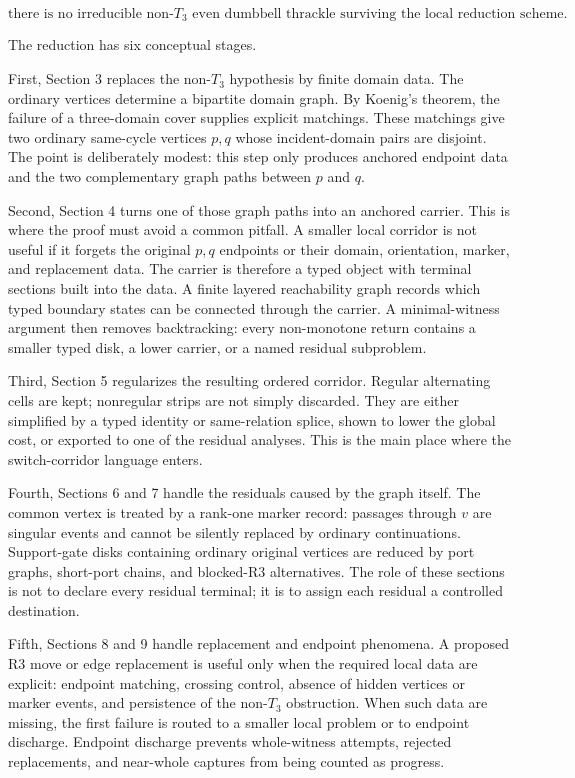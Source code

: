 \documentclass[11pt]{amsart}
\theoremstyle{definition}
\begin{document}
\[
\text{there is no irreducible non-}T_3\text{ even dumbbell thrackle
surviving the local reduction scheme.}
\]

The reduction has six conceptual stages.

First, Section 3 replaces the non-\(T_3\) hypothesis by finite domain data. The
ordinary vertices determine a bipartite domain graph. By Koenig's theorem, the
failure of a three-domain cover supplies explicit matchings. These matchings
give two ordinary same-cycle vertices \(p,q\) whose incident-domain pairs are
disjoint. The point is deliberately modest: this step only produces anchored
endpoint data and the two complementary graph paths between \(p\) and \(q\).

Second, Section 4 turns one of those graph paths into an anchored carrier. This
is where the proof must avoid a common pitfall. A smaller local corridor is not
useful if it forgets the original \(p,q\) endpoints or their domain, orientation,
marker, and replacement data. The carrier is therefore a typed object with
terminal sections built into the data. A finite layered reachability graph
records which typed boundary states can be connected through the carrier. A
minimal-witness argument then removes backtracking: every non-monotone return
contains a smaller typed disk, a lower carrier, or a named residual subproblem.

Third, Section 5 regularizes the resulting ordered corridor. Regular
alternating cells are kept; nonregular strips are not simply discarded. They
are either simplified by a typed identity or same-relation splice, shown to
lower the global cost, or exported to one of the residual analyses. This is the
main place where the switch-corridor language enters.

Fourth, Sections 6 and 7 handle the residuals caused by the graph itself. The
common vertex is treated by a rank-one marker record: passages through \(v\) are
singular events and cannot be silently replaced by ordinary continuations.
Support-gate disks containing ordinary original vertices are reduced by port
graphs, short-port chains, and blocked-R3 alternatives. The role of these
sections is not to declare every residual terminal; it is to assign each
residual a controlled destination.

Fifth, Sections 8 and 9 handle replacement and endpoint phenomena. A proposed
R3 move or edge replacement is useful only when the required local data are
explicit: endpoint matching, crossing control, absence of hidden vertices or
marker events, and persistence of the non-\(T_3\) obstruction. When such data are
missing, the first failure is routed to a smaller local problem or to endpoint
discharge. Endpoint discharge prevents whole-witness attempts, rejected
replacements, and near-whole captures from being counted as progress.
\end{document}
